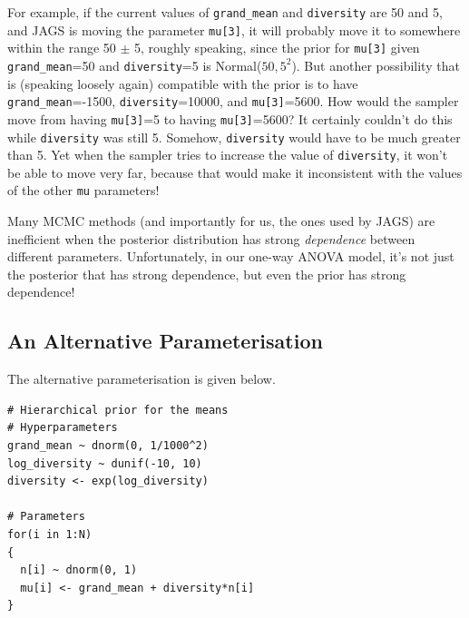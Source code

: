For example, if the current values of {\tt grand\_mean} and {\tt diversity}
are 50 and 5, and JAGS is moving the parameter {\tt mu[3]}, it will probably
move it to somewhere within the range 50 $\pm$ 5, roughly speaking, since
the prior for {\tt mu[3]} given {\tt grand\_mean}=50 and {\tt diversity}=5
is Normal($50, 5^2$). But another possibility that is (speaking loosely again)
compatible with the prior is to have {\tt grand\_mean}=-1500,
{\tt diversity}=10000, and {\tt mu[3]}=5600. How would the sampler move from
having {\tt mu[3]}=5 to having {\tt mu[3]}=5600? It certainly couldn't do this
while {\tt diversity} was still 5. Somehow, {\tt diversity} would have to be
much greater than 5. Yet when the sampler tries to increase the value of
{\tt diversity}, it won't be able to move very far, because that would make
it inconsistent with the values of the other {\tt mu} parameters!

Many MCMC methods (and importantly for us, the ones used by JAGS)
are inefficient when the posterior distribution has strong
{\it dependence} between different parameters. Unfortunately, in our one-way
ANOVA model, it's not just the posterior that has strong dependence, but
even the prior has strong dependence!

\subsection{An Alternative Parameterisation}


The alternative parameterisation is given below.

\begin{verbatim}
# Hierarchical prior for the means
# Hyperparameters
grand_mean ~ dnorm(0, 1/1000^2)
log_diversity ~ dunif(-10, 10)
diversity <- exp(log_diversity)

# Parameters
for(i in 1:N)
{
  n[i] ~ dnorm(0, 1)
  mu[i] <- grand_mean + diversity*n[i]
}
\end{verbatim}

